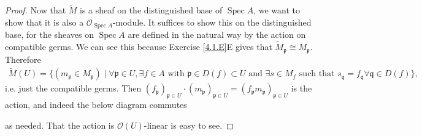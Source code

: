 \documentclass{article}
\newcommand{\fO}{\mathscr{O}}
\newcommand{\frkp}{\mathfrak{p}}
\newcommand{\frkq}{\mathfrak{q}}
\DeclareMathOperator{\Spec}{\mathrm{Spec}}
\theoremstyle{definition} %
\begin{document}
\begin{proof}
    Now that $\widetilde M$ is a sheaf on the distinguished base of $\Spec A$, we want to show that it is also a $\fO_{\Spec A}$-module. It suffices to show this on the distinguished base, for the sheaves on $\Spec A$ are defined in the natural way by the action on compatible germs. We can see this because Exercise \ref{4.1.E}E gives that $\widetilde M_\frkp \cong M_\frkp$. Therefore
    \begin{align*}
        \widetilde M (U) = \{(m_\frkp \in M_\frkp) \mid \forall \frkp \in U, \exists f \in A \text{ with } \frkp \in D(f)\subset U \text{ and } \exists s \in M_f \text{ such that } s_\frkq = f_\frkq \forall \frkq \in D(f)\},
    \end{align*}
    i.e. just the compatible germs. Then $(f_\frkp)_{\frkp \in U} \cdot (m_\frkp)_{\frkp \in U} = (f_\frkp m_\frkp)_{\frkp \in U}$ is the action, and indeed the below diagram commutes
    \begin{center}
    \end{center}
    as needed. That the action is $\fO(U)$-linear is easy to see.
\end{proof}
\end{document}
